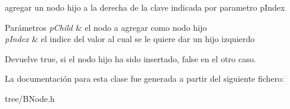 agregar un nodo hijo a la derecha de la clave indicada por parametro p\-Index 


\begin{DoxyParams}{Parámetros}
{\em p\-Child} & el nodo a agregar como nodo hijo \\
\hline
{\em p\-Index} & el indice del valor al cual se le quiere dar un hijo izquierdo \\
\hline
\end{DoxyParams}
\begin{DoxyReturn}{Devuelve}
true, si el nodo hijo ha sido insertado, false en el otro caso. 
\end{DoxyReturn}


La documentación para esta clase fue generada a partir del siguiente fichero\-:\begin{DoxyCompactItemize}
\item 
tree/B\-Node.\-h\end{DoxyCompactItemize}
